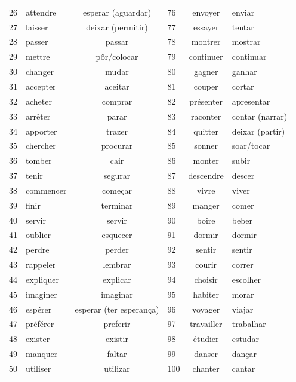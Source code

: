 \documentclass[a4paper,12pt]{article}
\begin{document}
\begin{longtable}{c l c l c l}
    26 & attendre & esperar (aguardar) & 76 & envoyer & enviar \\
    27 & laisser & deixar (permitir) & 77 & essayer & tentar \\
    28 & passer & passar & 78 & montrer & mostrar \\
    29 & mettre & pôr/colocar & 79 & continuer & continuar \\
    30 & changer & mudar & 80 & gagner & ganhar \\
    31 & accepter & aceitar & 81 & couper & cortar \\
    32 & acheter & comprar & 82 & présenter & apresentar \\
    33 & arrêter & parar & 83 & raconter & contar (narrar) \\
    34 & apporter & trazer & 84 & quitter & deixar (partir) \\
    35 & chercher & procurar & 85 & sonner & soar/tocar \\
    36 & tomber & cair & 86 & monter & subir \\
    37 & tenir & segurar & 87 & descendre & descer \\
    38 & commencer & começar & 88 & vivre & viver \\
    39 & finir & terminar & 89 & manger & comer \\
    40 & servir & servir & 90 & boire & beber \\
    41 & oublier & esquecer & 91 & dormir & dormir \\
    42 & perdre & perder & 92 & sentir & sentir \\
    43 & rappeler & lembrar & 93 & courir & correr \\
    44 & expliquer & explicar & 94 & choisir & escolher \\
    45 & imaginer & imaginar & 95 & habiter & morar \\
    46 & espérer & esperar (ter esperança) & 96 & voyager & viajar \\
    47 & préférer & preferir & 97 & travailler & trabalhar \\
    48 & exister & existir & 98 & étudier & estudar \\
    49 & manquer & faltar & 99 & danser & dançar \\
    50 & utiliser & utilizar & 100 & chanter & cantar \\
    \bottomrule
\end{longtable}

\end{document}
